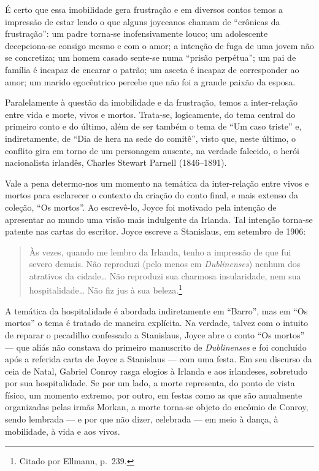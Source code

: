 É certo que essa imobilidade gera frustração e em diversos contos temos a
impressão de estar lendo o que alguns joyceanos chamam de “crônicas da
frustração”: um padre torna-se inofensivamente louco; um adolescente
decepciona-se consigo mesmo e com o amor; a intenção de fuga de uma jovem não
se concretiza; um homem casado sente-se numa “prisão perpétua”; um pai de
família é incapaz de encarar o patrão; um asceta é incapaz de corresponder ao
amor; um marido egocêntrico percebe que não foi a grande paixão da esposa.

Paralelamente à questão da imobilidade e da frustração, temos a inter-relação
entre vida e morte, vivos e mortos. Trata-se, logicamente, do tema central do
primeiro conto e do último, além de ser também o tema de “Um caso triste” e,
indiretamente, de “Dia de hera na sede do comitê”, visto que, neste último, o
conflito gira em torno de um personagem ausente, na verdade falecido, o herói
nacionalista irlandês, Charles Stewart Parnell (1846--1891).

Vale a pena determo-nos um momento na temática da inter-relação entre vivos e
mortos para esclarecer o contexto da criação do conto final, e mais extenso da
coleção, “Os mortos”. Ao escrevê-lo, Joyce foi motivado pela intenção
de apresentar ao mundo uma visão mais indulgente da Irlanda. Tal intenção
torna-se patente nas cartas do escritor. Joyce escreve a Stanislaus, em
setembro de 1906: 

\begin{quote}
Às vezes, quando me lembro da Irlanda, tenho a impressão de
que fui severo demais. Não reproduzi (pelo menos em \textit{Dublinenses}) nenhum
dos atrativos da cidade\ldots{} Não reproduzi sua charmosa insularidade, nem sua
hospitalidade\ldots{} Não fiz jus à sua beleza.\footnote{ Citado por Ellmann, p.~239.}
\end{quote}

A temática da hospitalidade é abordada indiretamente em “Barro”, mas em “Os
mortos” o tema é tratado de maneira explícita. Na verdade, talvez com o intuito
de reparar o pecadilho confessado a Stanislaus, Joyce abre o conto “Os mortos”
--- que aliás não constava do primeiro manuscrito de \textit{Dublinenses} e
foi concluído após a referida carta de Joyce a Stanislaus --- com uma festa.
Em seu discurso da ceia de Natal, Gabriel Conroy rasga elogios à Irlanda e aos
irlandeses, sobretudo por sua hospitalidade. Se por um lado, a morte
representa, do ponto de vista físico, um momento extremo, por outro, em festas
como as que são anualmente organizadas pelas irmãs Morkan, a morte torna-se
objeto do encômio de Conroy, sendo lembrada --- e por que não dizer, celebrada ---
em meio à dança, à mobilidade, à vida e aos vivos.

